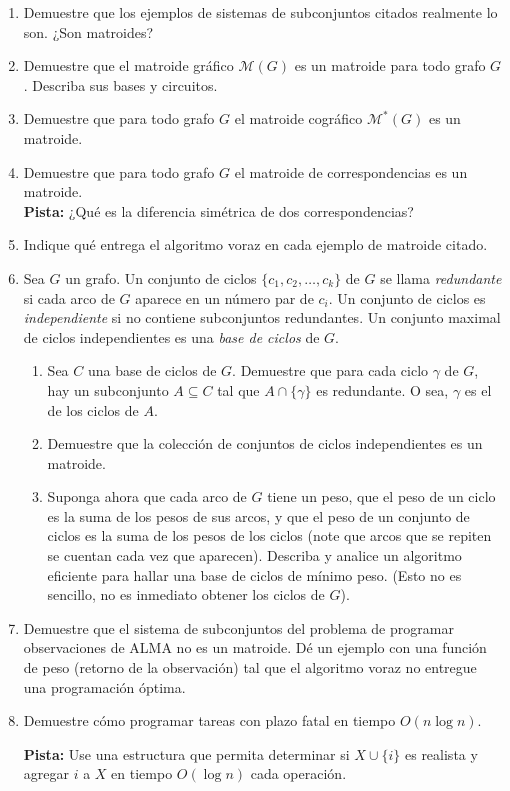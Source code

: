  \begin{enumerate}
  \item
    Demuestre que los ejemplos de sistemas de subconjuntos citados
    realmente lo son.
    ¿Son matroides?
  \item
    Demuestre que el matroide gráfico \(\mathscr{M}(G)\) es un matroide
    para todo grafo \(G\).
    Describa sus bases y circuitos.
  \item
    Demuestre que para todo grafo \(G\)
    el matroide cográfico \(\mathscr{M}^*(G)\) es un matroide.
  \item
    Demuestre que para todo grafo \(G\) el matroide de correspondencias
    es un matroide.
    \\ \textbf{Pista:}
       ¿Qué es la diferencia simétrica de dos correspondencias?
  \item
    Indique qué entrega el algoritmo voraz en cada ejemplo de matroide citado.
  \item
    Sea \(G\) un grafo.
    Un conjunto de ciclos \(\{ c_1, c_2, \dotsc, c_k \}\) de \(G\)
    se llama \emph{redundante} si cada arco de \(G\)
    aparece en un número par de \(c_i\).
    Un conjunto de ciclos es \emph{independiente}
    si no contiene subconjuntos redundantes.
    Un conjunto maximal de ciclos independientes es una \emph{base de ciclos}
    de \(G\).
    \begin{enumerate}
    \item
      Sea \(C\) una base de ciclos de \(G\).
      Demuestre que para cada ciclo \(\gamma\) de \(G\),
      hay un subconjunto \(A \subseteq C\) tal que \(A \cap \{ \gamma \}\)
      es redundante.
      O sea,
      \(\gamma\) es el  de los ciclos de \(A\).
    \item
      Demuestre que la colección de conjuntos de ciclos independientes
      es un matroide.
    \item
      Suponga ahora que cada arco de \(G\) tiene un peso,
      que el peso de un ciclo es la suma de los pesos de sus arcos,
      y que el peso de un conjunto de ciclos
      es la suma de los pesos de los ciclos
      (note que arcos que se repiten se cuentan cada vez que aparecen).
      Describa y analice un algoritmo eficiente
      para hallar una base de ciclos de mínimo peso.
      (Esto no es sencillo,
       no es inmediato obtener los ciclos de \(G\)).
    \end{enumerate}
  \item
    Demuestre que el sistema de subconjuntos
    del problema de programar observaciones de ALMA no es un matroide.
    Dé un ejemplo con una función de peso
    (retorno de la observación)
    tal que el algoritmo voraz no entregue una programación óptima.
  \item
    Demuestre cómo programar tareas con plazo fatal en tiempo \(O(n \log n)\).

    \textbf{Pista:} Use una estructura
      que permita determinar si \(X \cup \{ i \}\) es realista
      y agregar \(i\) a \(X\) en tiempo \(O(\log n)\) cada operación.
  \end{enumerate}

